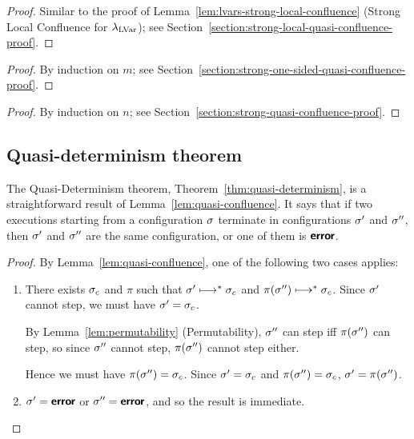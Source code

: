 \LemStrongLocalQuasiConfluence
\begin{proof}
  Similar to the proof of
  Lemma~\ref{lem:lvars-strong-local-confluence} (Strong Local
  Confluence for $\lambda_{\textrm{LVar}}$); see
  Section~\ref{section:strong-local-quasi-confluence-proof}.
\end{proof}

\LemStrongOneSidedQuasiConfluence
\begin{proof}
  By induction on $m$; see
  Section~\ref{section:strong-one-sided-quasi-confluence-proof}.
\end{proof}

\LemStrongQuasiConfluence
\begin{proof}
  By induction on $n$; see
  Section~\ref{section:strong-quasi-confluence-proof}.
\end{proof}

\LemQuasiConfluence
 
\subsection{Quasi-determinism theorem}\label{subsection:quasi-quasi-determinism}

The Quasi-Determinism theorem, Theorem~\ref{thm:quasi-determinism}, is
a straightforward result of Lemma~\ref{lem:quasi-confluence}.  It says
that if two executions starting from a configuration $\sigma$ terminate
in configurations $\sigma'$ and $\sigma''$, then $\sigma'$ and $\sigma''$
are the same configuration, or one of them is $\textbf{\textsf{error}}$.

\ThmQuasiDeterminism
\begin{proof}
  By Lemma~\ref{lem:quasi-confluence}, one of the following two cases
  applies:
  \begin{enumerate}
    \item There exists $\sigma_c$ and $\pi$ such that $\sigma'
      \longmapsto^* \sigma_c$ and $\pi(\sigma'') \longmapsto^* \sigma_c$.
      Since $\sigma'$ cannot step, we must have $\sigma' = \sigma_c$.

      By Lemma~\ref{lem:permutability} (Permutability), $\sigma''$ can
      step iff $\pi(\sigma'')$ can step, so since $\sigma''$ cannot
      step, $\pi(\sigma'')$ cannot step either.

      Hence we must have $\pi(\sigma'') = \sigma_c$.  Since $\sigma' =
      \sigma_c$ and $\pi(\sigma'') = \sigma_c$, $\sigma' = \pi(\sigma'')$.
    \item $\sigma' = \textbf{\textsf{error}}$ or $\sigma'' = \textbf{\textsf{error}}$, and so the result
      is immediate.
  \end{enumerate}
\end{proof}

